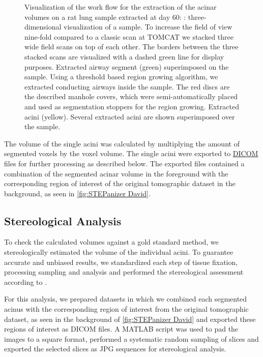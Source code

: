 \documentclass[paper=a4,abstract=true,english,DIV=calc]{scrartcl}
\newlength\imagescale		%
\begin{document}
\begin{figure}
{\begin{tikzpicture}[x=\imagescale,y=-\imagescale]
		\end{tikzpicture}%
		\label{subfig:extracted acini}%
		}
	\caption{Visualization of the work flow for the extraction of the acinar volumes on a rat lung sample extracted at day 60: %
		\protect{}: three-dimensional visualization of a sample.
		To increase the field of view nine-fold compared to a classic scan at TOMCAT we stacked three wide field scans on top of each other.
		The borders between the three stacked scans are visualized with a dashed green line for display purposes.
		\protect{} Extracted airway segment (green) superimposed on the sample.
		Using a threshold based region growing algorithm, we extracted conducting airways inside the sample.
		The red discs are the described manhole covers, which were semi-automatically placed and used as segmentation stoppers for the region growing.
		\protect{} Extracted acini (yellow).
		Several extracted acini are shown superimposed over the sample.}
	\label{fig:workflow}
\end{figure}

The volume of the single acini was calculated by multiplying the amount of segmented voxels by the voxel volume.
The single acini were exported to \href{https://secure.wikimedia.org/wikipedia/en/w/index.php?title=Digital_Imaging_and_Communications_in_Medicine&oldid=415023605}{DICOM} files for further processing as described below.
The exported files contained a combination of the segmented acinar volume in the foreground with the corresponding region of interest of the original tomographic dataset in the background, as seen in \autoref{fig:STEPanizer David}.

\subsection{Stereological Analysis}
To check the calculated volumes against a gold standard method, we stereologically estimated the volume of the individual acini.
To guarantee accurate and unbiased results, we standardized each step of tissue fixation, processing sampling and analysis and performed the stereological assessment according to \citet{Hsia2010}.

For this analysis, we prepared datasets in which we combined each segmented acinus with the corresponding region of interest from the original tomographic dataset, as seen in the background of \autoref{fig:STEPanizer David} and exported these regions of interest as DICOM files.
A MATLAB script was used to pad the images to a square format, performed a systematic random sampling of slices and exported the selected slices as JPG sequences for stereological analysis.
\end{document}
